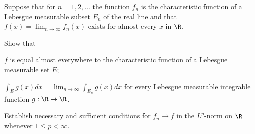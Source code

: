 Suppose that for $n=1,2,\ldots $ the function $f_n$ is the
characteristic function of a Lebesgue measurable subset $E_n$ of the
real line and that $f(x)=\lim_{n\rightarrow \infty}f_n(x)$ exists for
almost every $x$ in $\R$. 

Show that
\begin{alist}
\item $f$ is equal almost everywhere to the characteristic function
of a Lebesgue measurable set $E$;
\item $\int_Eg(x)dx=\lim_{n\rightarrow \infty}\int_{E_n}g(x)dx$ 
for every Lebesgue measurable integrable function $g:\R\rightarrow
\R$.
\end{alist}

Establish necessary and sufficient conditions for $f_n\rightarrow f$
in the $L^p$-norm on $\R$ whenever $1\leq p<\infty$.

